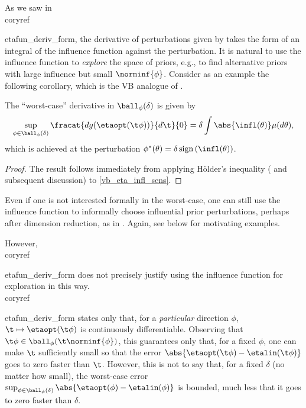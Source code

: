 As we saw in \\coryref{{etafun_deriv_form}, the derivative of perturbations given
by  takes the form of an integral of the influence
function against the perturbation.  It is natural to use the influence function
to {\em explore} the space of priors, e.g., to find alternative priors with
large influence but small $\norminf{\phi}$.  Consider as an example the
following corollary, which is the VB analogue of \citet[Result
11]{gustafson:1996:local}.


\begin{cor}
%
The ``worst-case'' derivative in $\ball_\phi(\delta)$ is given by
%
\begin{align*}
%
\sup_{\phi \in \ball_\phi(\delta)}
    \fracat{d g(\etaopt(\t \phi))}{d \t}{0} =
        \delta \int \abs{\infl(\theta)} \mu(d\theta),
%
\end{align*}
%
which is achieved at the perturbation
$\phi^*(\theta) = \delta \, \mathrm{sign}\left(\infl(\theta)\right)$.
%
\begin{proof}
%
The result follows immediately from applying H{\"o}lder's inequality
(\citet[Theorem 5.1.2]{dudley:2018:real} and subsequent discussion)
to \eqref{vb_eta_infl_sens}.
%
\end{proof}
%
\end{cor}


Even if one is not interested formally in the worst-case, one can still use the
influence function to informally choose influential prior perturbations, perhaps
after dimension reduction, as in .  Again, see
 below for motivating examples.

However, \\coryref{{etafun_deriv_form} does not precisely justify using the
influence function for exploration in this way.  \\coryref{{etafun_deriv_form}
states only that, for a {\em particular} direction $\phi$, $\t \mapsto
\etaopt(\t \phi)$ is continuously differentiable.  Observing that $\t \phi \in
\ball_\phi(\t \norminf{\phi})$, this guarantees only that, for a fixed $\phi$,
one can make $\t$ sufficiently small so that the error $\abs{\etaopt(\t \phi) -
\etalin(\t \phi)}$ goes to zero faster than $\t$. However, this is not to say
that, for a fixed $\delta$ (no matter how small), the worst-case error
$\sup_{\phi \in \ball_\phi(\delta)} \abs{\etaopt(\phi) - \etalin(\phi)}$ is
bounded, much less that it goes to zero faster than $\delta$.

}}}
